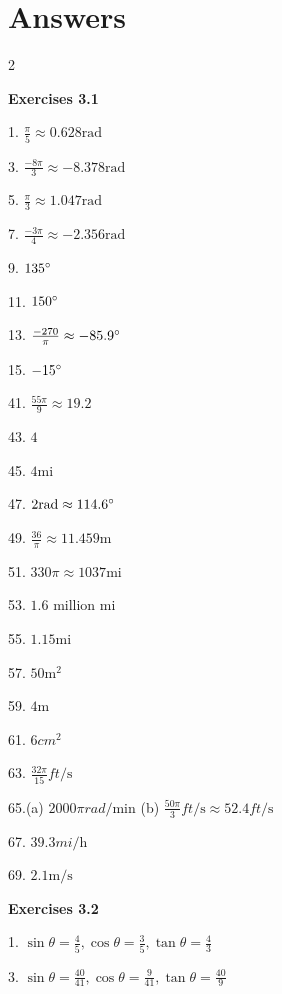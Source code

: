 \section{Answers}
\columnsep =30pt
\begin {multicols}{2}
 

\textbf{Exercises 3.1} 

1. $\frac{\pi }{5} \approx 0.628 \mbox{rad}$ 

3. $\frac{ -8 \pi }{3} \approx  -8.378 \mbox{rad}$ 

5. $\frac{\pi }{3} \approx 1.047 \mbox{rad}$ 

7. $\frac{ -3 \pi }{4} \approx  -2.356 \mbox{rad}$ 

9. $135 \mbox{{\ensuremath{{}^\circ}}}$ 

11. $150 \mbox{{\ensuremath{{}^\circ}}}$ 

13. $\frac{ -270}{\pi } \approx  -85.9 \mbox{{\ensuremath{{}^\circ}}}$ 

15. $ -15 \mbox{{\ensuremath{{}^\circ}}}$ 

41. $\frac{55 \pi }{9} \approx 19.2$ 

43. $4$ 

45. $4 \mbox{mi}$ 

47. $2 \mbox{rad} \approx 114.6 \mbox{{\ensuremath{{}^\circ}}}$ 

49. $\frac{36}{\pi } \approx 11.459 \mbox{m}$ 

51. $330 \pi  \approx 1037 \mbox{mi}$ 

53. $1.6$ million $\mbox{mi}$ 

55. $1.15 \mbox{mi}$ 

57. $50 \mathrm{m}^{2}$ 

59. $4 \mbox{m}$ 

61. $6 cm^{2}$ 

63. $\frac{32 \pi }{15} ft/\mbox{s}$ 

65.(a) $2000 \pi  rad/\mbox{min}$ (b) $\frac{50 \pi }{3} ft/\mbox{s} \approx 52.4 ft/\mbox{s}$ 

67. $39.3 mi/\mbox{h}$ 

69. $2.1 \mathrm{m}/\mbox{s}$ 

\textbf{Exercises 3.2} 

1. $\sin  \theta  =\frac{4}{5} ,\cos  \theta  =\frac{3}{5} ,\tan  \theta  =\frac{4}{3}$ 

3. $\sin  \theta  =\frac{40}{41} ,\cos  \theta  =\frac{9}{41} ,\tan  \theta  =\frac{40}{9}$ 


\end{multicols}
